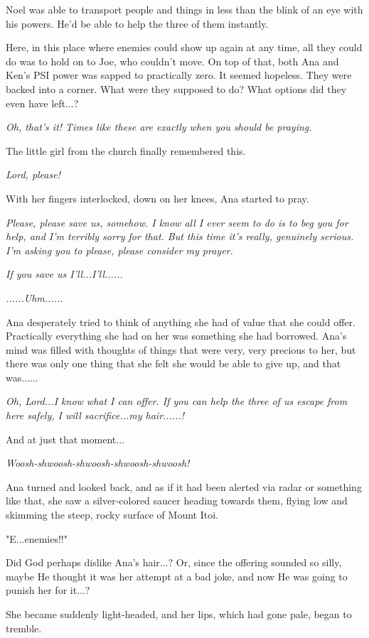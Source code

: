 \documentclass[
]{article}
\begin{document}
Noel was able to transport people and things in less than the blink of
an eye with his powers. He'd be able to help the three of them
instantly.

Here, in this place where enemies could show up again at any time, all
they could do was to hold on to Joe, who couldn't move. On top of that,
both Ana and Ken's PSI power was sapped to practically zero. It seemed
hopeless. They were backed into a corner. What were they supposed to do?
What options did they even have left...?

\emph{Oh, that's it! Times like these are exactly when you should be
praying.}

The little girl from the church finally remembered this.

\emph{Lord, please!}

With her fingers interlocked, down on her knees, Ana started to pray.

\emph{Please, please save us, somehow. I know all I ever seem to do is
to beg you for help, and I'm terribly sorry for that. But this time it's
really, genuinely serious. I'm asking you to please, please consider my
prayer.}

\emph{If you save us I'll...I'll......}

\emph{......Uhm......}

\emph{}Ana desperately tried to think of anything she had of value that
she could offer. Practically everything she had on her was something she
had borrowed. Ana's mind was filled with thoughts of things that were
very, very precious to her, but there was only one thing that she felt
she would be able to give up, and that was......

\emph{Oh, Lord...I know what I can offer. If you can help the three of
us escape from here safely, I will sacrifice...my hair......!}

And at just that moment...

\emph{Woosh-shwoosh-shwoosh-shwoosh-shwoosh!}

Ana turned and looked back, and as if it had been alerted via radar or
something like that, she saw a silver-colored saucer heading towards
them, flying low and skimming the steep, rocky surface of Mount Itoi.

"E...enemies!!"

Did God perhaps dislike Ana's hair...? Or, since the offering sounded so
silly, maybe He thought it was her attempt at a bad joke, and now He was
going to punish her for it...?

She became suddenly light-headed, and her lips, which had gone pale,
began to tremble.
\end{document}
